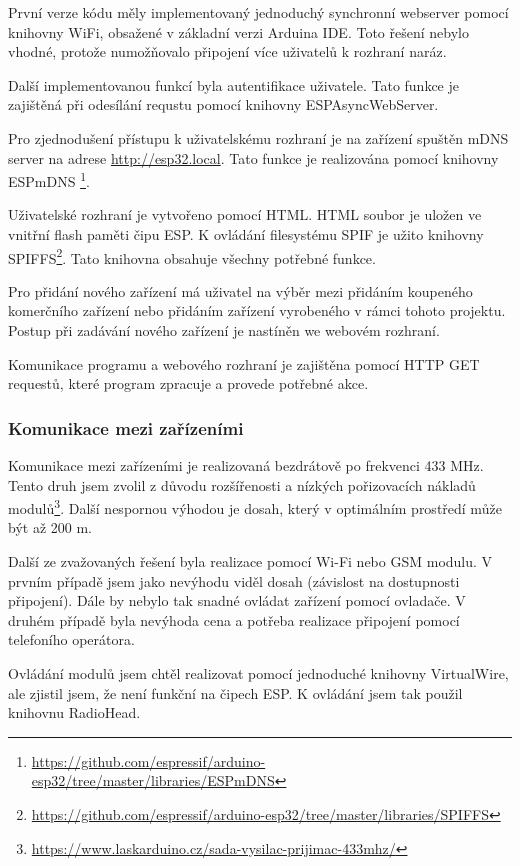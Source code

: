 \documentclass[11pt,a4paper,twoside,openright]{report}
\begin{document}
	
	První verze kódu měly implementovaný jednoduchý synchronní webserver pomocí knihovny WiFi, obsažené v základní verzi Arduina IDE. Toto řešení nebylo vhodné, protože numožňovalo připojení více uživatelů k rozhraní naráz.
	
	
	Další implementovanou funkcí byla autentifikace uživatele. Tato funkce je zajištěná při odesílání requstu pomocí knihovny ESPAsyncWebServer.
	
	
	Pro zjednodušení přístupu k uživatelskému rozhraní je na zařízení spuštěn mDNS server na adrese \url{http://esp32.local}. Tato funkce je realizována pomocí knihovny ESPmDNS \footnote{\url{https://github.com/espressif/arduino-esp32/tree/master/libraries/ESPmDNS}}.
	
	
	Uživatelské rozhraní je vytvořeno pomocí HTML. HTML soubor je uložen ve vnitřní flash paměti čipu ESP. K ovládání filesystému SPIF je užito knihovny SPIFFS\footnote{\url{https://github.com/espressif/arduino-esp32/tree/master/libraries/SPIFFS}}. Tato knihovna obsahuje všechny potřebné funkce.
	
	
	Pro přidání nového zařízení má uživatel na výběr mezi přidáním koupeného komerčního zařízení nebo přidáním zařízení vyrobeného v rámci tohoto projektu. Postup při zadávání nového zařízení je nastíněn we webovém rozhraní.
	
	
	Komunikace programu a webového rozhraní je zajištěna pomocí HTTP GET requestů, které program zpracuje a provede potřebné akce. 
	
	
	\subsubsection{Komunikace mezi zařízeními}
	
	Komunikace mezi zařízeními je realizovaná bezdrátově po frekvenci 433 MHz. Tento druh jsem zvolil z důvodu rozšířenosti a nízkých pořizovacích nákladů modulů\footnote{\url{https://www.laskarduino.cz/sada-vysilac-prijimac-433mhz/}}. Další nespornou výhodou je dosah, který v optimálním prostředí může být až 200 m.
	
	
	Další ze zvažovaných řešení byla realizace pomocí Wi-Fi nebo GSM modulu. V prvním případě jsem jako nevýhodu viděl dosah (závislost na dostupnosti připojení). Dále by nebylo tak snadné ovládat zařízení pomocí ovladače. V druhém případě byla nevýhoda cena a potřeba realizace připojení pomocí telefoního operátora.
	
	
	Ovládání modulů jsem chtěl realizovat pomocí jednoduché knihovny VirtualWire, ale zjistil jsem, že není funkční na čipech ESP. K ovládání jsem tak použil knihovnu RadioHead. 
	
\end{document}
